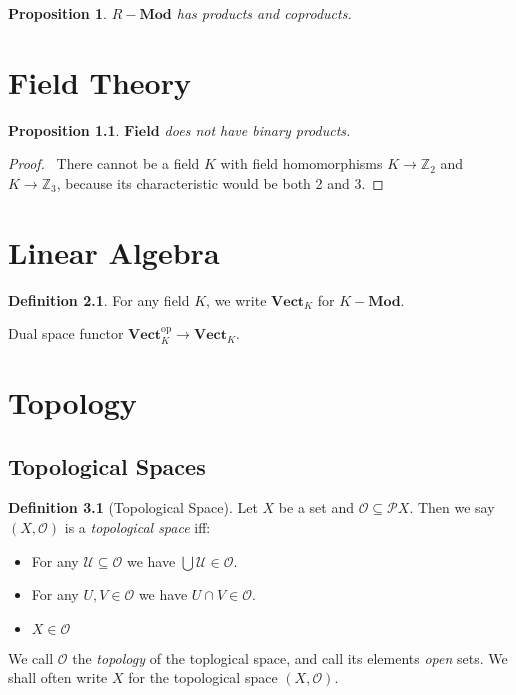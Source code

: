 \documentclass{book}
\let\qed\relax
\newtheorem{prop}[ax]{Proposition}
\theoremstyle{definition}
\newtheorem{df}[ax]{Definition}
\begin{document}
\begin{prop}
$R-\mathbf{Mod}$ has products and coproducts.
\end{prop}

\chapter{Field Theory}

\begin{prop}
$\mathbf{Field}$ does not have binary products.
\end{prop}

\begin{proof}
\pf\ There cannot be a field $K$ with field homomorphisms $K \rightarrow \mathbb{Z}_2$ and $K \rightarrow \mathbb{Z}_3$, because its characteristic would be both 2 and 3. \qed
\end{proof}

\chapter{Linear Algebra}

\begin{df}
For any field $K$, we write $\mathbf{Vect}_K$ for $K-\mathbf{Mod}$.
\end{df}

Dual space functor $\mathbf{Vect}_K^{\mathrm{op}} \rightarrow \mathbf{Vect}_K$.

\chapter{Topology}

\section{Topological Spaces}

\begin{df}[Topological Space]
Let $X$ be a set and $\mathcal{O} \subseteq \mathcal{P} X$. Then we say $(X, \mathcal{O})$ is a \emph{topological space} iff:
\begin{itemize}
\item For any $\mathcal{U} \subseteq \mathcal{O}$ we have $\bigcup \mathcal{U} \in \mathcal{O}$.
\item For any $U, V \in \mathcal{O}$ we have $U \cap V \in \mathcal{O}$.
\item $X \in \mathcal{O}$
\end{itemize}
We call $\mathcal{O}$ the \emph{topology} of the toplogical space, and call its elements \emph{open} sets. We shall often write $X$ for the topological space $(X, \mathcal{O})$.
\end{df}
\end{document}
